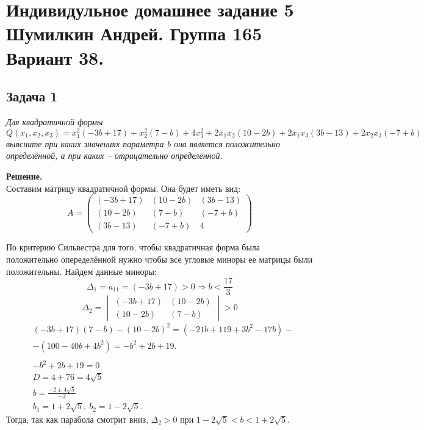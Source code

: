 

	\section{Индивидульное домашнее задание 5 \\ Шумилкин Андрей. Группа 165 \\ Вариант 38. } 
	\subsection{Задача 1} 
	\textit{Для квадратичной формы 
		\[
		Q(x_1, x_2, x_3) = x_1^2(-3b + 17) + x_2^2(7 - b) + 4x_3^2 + 2x_1x_2(10 - 2b) + 2x_1x_3(3b - 13) + 2x_2x_3(-7 + b)
		\]
	выясните при каких значениях параметра b она является положительно определённой, а при каких -- отрицательно определённой.}

	\textbf{Решение.}\\
	Составим матрицу квадратичной формы. Она будет иметь вид: 
	\[ A=
	\begin{pmatrix}
	(-3b + 17) & (10 - 2b) & (3b - 13) \\
	(10 - 2b) & (7 - b) & (-7 + b) \\
	(3b - 13) & (-7 + b) & 4
	\end{pmatrix}
	\]
	
	По критерию Сильвестра для того, чтобы квадратичная форма была положительно опеределённой нужно чтобы все угловые миноры ее матрицы были положительны. Найдем данные миноры:
	\[
		\Delta_1 = a_{11} = (-3b + 17) > 0 \Rightarrow b < \frac{17}{3}
	\]
	\[
		\Delta_2 = \begin{vmatrix}
		(-3b + 17) & (10 - 2b) \\
		(10 - 2b) & (7 - b)
		\end{vmatrix} > 0
	\]
	\begin{align*}
	&(-3b + 17)(7 - b) - (10 - 2b)^2 = (-21b + 119 + 3b^2 -17b) - \\ 
	& - (100 -40b + 4b^2) = -b^2 + 2b + 19. \\
	\\
	&-b^2 + 2b + 19 = 0 \\
	&D = 4 + 76 = 4\sqrt{5} \\
	&b = \frac{-2 \pm 4\sqrt{5}}{-2} \\
	&b_1 = 1 + 2\sqrt{5},\ b_2 = 1 - 2\sqrt{5}.
	\end{align*}
	Тогда, так как парабола смотрит вниз, $\Delta_2 > 0$ при $1 - 2\sqrt{5} < b < 1 + 2\sqrt{5}$.


